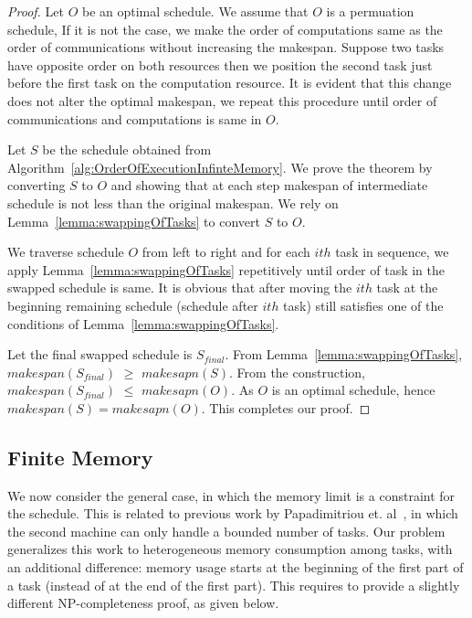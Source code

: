 \documentclass[runningheads]{llncs} %
\begin{document}
\begin{proof}
	
	Let $O$ be an optimal schedule. We assume that $O$ is a permuation schedule, If it is not the case, we make the order of computations same as the order of communications without increasing the makespan.  Suppose two tasks have opposite order on both resources then we position the second task just before the first task on the computation resource. It is evident that this change does not alter the optimal  makespan, we repeat this procedure until order of communications and computations is same in $O$.
	
	Let $S$ be the  schedule obtained from Algorithm~\ref{alg:OrderOfExecutionInfinteMemory}. We prove the theorem by converting $S$ to $O$ and showing that at each step makespan of intermediate schedule is not less than the original makespan. We rely on Lemma~\ref{lemma:swappingOfTasks} to convert $S$ to $O$.
	
	We traverse schedule $O$ from left to right and for each $ith$ task in sequence, we apply Lemma~\ref{lemma:swappingOfTasks} repetitively until order of task in the swapped schedule is same. It is obvious that after moving the $ith$ task at the beginning remaining schedule (schedule after $ith$ task) still satisfies one of the conditions of Lemma~\ref{lemma:swappingOfTasks}.
	
	Let the final swapped schedule is $S_{final}$. From Lemma~\ref{lemma:swappingOfTasks}, $makespan(S_{final})$ $ \ge $ $makesapn(S)$. From the construction, $makespan(S_{final})$ $ \le$ $ makesapn(O)$. As $O$ is an optimal schedule, hence $makespan(S) = makesapn(O)$. This completes our proof.
\end{proof}


\subsection{Finite Memory}


We now consider the general case, in which the memory limit is a
constraint for the schedule. This is related to previous work by
Papadimitriou et. al~\cite{Papadimitriou:1980:FSL:322203.322213}, in which the second machine
can only handle a bounded number of tasks. Our problem generalizes this
work to heterogeneous memory consumption among tasks, with an
additional difference: memory usage starts at the beginning of the
first part of a task (instead of at the end of the first part). This
requires to provide a slightly different NP-completeness proof, as
given below.
\end{document}

